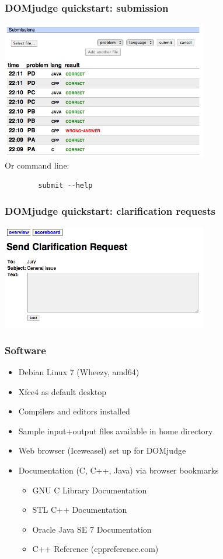 \documentclass[t]{beamer}
\begin{document}
\begin{frame}[fragile]
\frametitle{DOMjudge quickstart: submission}
	\includegraphics[width=90mm]{submissions.png}
	\\Or command line:
	\begin{lstlisting}
		submit --help
	\end{lstlisting}
\end{frame}
\begin{frame}
	\frametitle{DOMjudge quickstart: clarification requests}
	\includegraphics[width=90mm]{clarreq.png}
\end{frame}
\begin{frame}
	\frametitle{Software}
	\begin{itemize}
	\item Debian Linux 7 (Wheezy, amd64)
	\end{itemize}
	\begin{itemize}
		\item Xfce4 as default desktop
		\item Compilers and editors installed
		\item Sample input+output files available in home directory
		\item Web browser (Iceweasel) set up for DOMjudge
	\item Documentation (C, C++, Java) via browser bookmarks
		\begin{itemize}
			\item GNU C Library Documentation
			\item STL C++ Documentation
			\item Oracle Java SE 7 Documentation
			\item C++ Reference (cppreference.com)
		\end{itemize}
	\end{itemize}
\end{frame}
\end{document}
